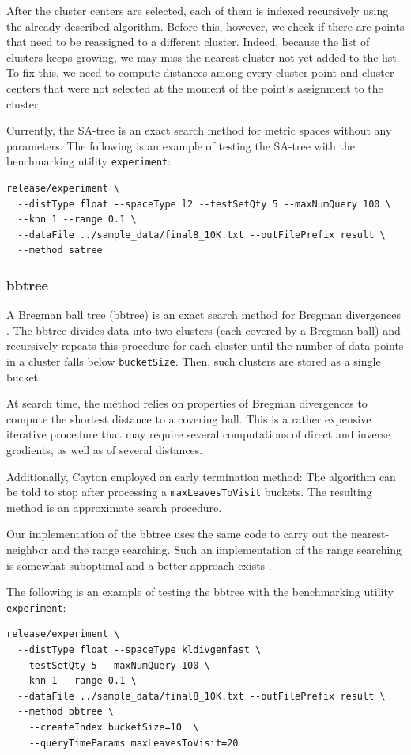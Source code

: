 \documentclass[runningheads,a4paper]{llncs}
\newcommand{\ttt}[1]{\texttt{#1}}
\begin{document}
{After the cluster centers are selected, each of them is indexed recursively using the already described
algorithm. Before this, however, we check  if there are points that need to be reassigned to a different cluster.
Indeed, because the list of clusters keeps growing, we may miss the nearest cluster not yet
added to the list. To fix this, we need  to compute distances among every cluster point
and cluster centers that were not selected at the moment of the point's assignment to the cluster.

Currently, the SA-tree is an exact search method for metric spaces without any parameters.
The following is an example of testing the SA-tree with the benchmarking utility \ttt{experiment}:
{
\footnotesize
\begin{verbatim}
release/experiment \
  --distType float --spaceType l2 --testSetQty 5 --maxNumQuery 100 \
  --knn 1 --range 0.1 \
  --dataFile ../sample_data/final8_10K.txt --outFilePrefix result \
  --method satree 
\end{verbatim}
}

\subsubsection{bbtree}
A Bregman ball tree (bbtree) is an exact search method for Bregman divergences \cite{Cayton2008}.
The bbtree divides data into two clusters (each covered by a Bregman ball)
and recursively repeats this procedure for each cluster until the number of data points
in a cluster falls below \ttt{bucketSize}. Then, such clusters are stored as a single bucket.

At search time, the method relies on properties of Bregman divergences 
to compute the shortest distance to a covering ball. 
This is a rather expensive iterative procedure that 
may require several computations of direct and inverse gradients,
as well as of several distances.

Additionally, Cayton  \cite{Cayton2008} employed an early termination method:
The algorithm  can be told to stop after processing
a \ttt{maxLeavesToVisit} buckets.
The resulting method is an approximate search procedure.

Our implementation of the bbtree uses the same code to carry
out the nearest-neighbor and
the range searching. 
Such an implementation of the range searching is somewhat suboptimal
and a better approach exists \cite{cayton2009efficient}.

\newpage
The following is an example of testing the bbtree with the benchmarking utility \ttt{experiment}:
{
\footnotesize
\begin{verbatim}
release/experiment \
  --distType float --spaceType kldivgenfast \
  --testSetQty 5 --maxNumQuery 100 \
  --knn 1 --range 0.1 \
  --dataFile ../sample_data/final8_10K.txt --outFilePrefix result \
  --method bbtree \
    --createIndex bucketSize=10  \
    --queryTimeParams maxLeavesToVisit=20 
\end{verbatim}
}

}
\end{document}
